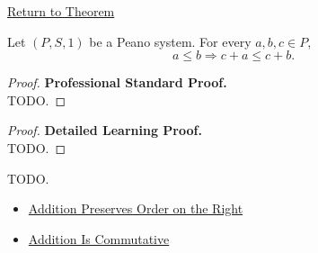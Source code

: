 \newpage
{}
\label{prf:addition-preserves-order-on-left}

\begin{remark*}[Return]
\hyperref[thm:addition-preserves-order-on-left]{Return to Theorem}
\end{remark*}

\begin{theorem*}
Let $(P,S,1)$ be a Peano system. For every $a,b,c \in P$,
\[
a \le b
\Longrightarrow
c+a \le c+b.
\]
\end{theorem*}

\begin{proof}
\textbf{Professional Standard Proof.}~\\
TODO.
\end{proof}

\begin{proof}
\textbf{Detailed Learning Proof.}~\\
TODO.
\end{proof}

\begin{remark*}
TODO.
\end{remark*}

\begin{dependencies}
\begin{itemize}
  \item \hyperref[thm:addition-preserves-order-on-right]{Addition Preserves Order on the Right}
  \item \hyperref[thm:addition-commutative]{Addition Is Commutative}
\end{itemize}
\end{dependencies}
